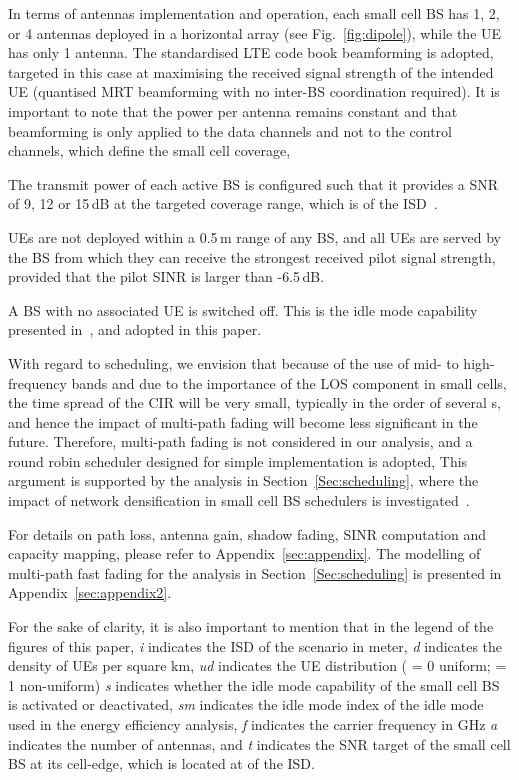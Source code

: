 \documentclass{IEEEtran}
\begin{document}
In terms of antennas implementation and operation,
each small cell \ac{BS} has 1, 2, or 4 antennas deployed in a horizontal array (see Fig.~\ref{fig:dipole}),
while the \ac{UE} has only 1 antenna.
The standardised \ac{LTE} code book beamforming is adopted,
targeted in this case at maximising the received signal strength of the intended \ac{UE}
(quantised \ac{MRT} beamforming with no inter-\ac{BS} coordination required).
It is important to note that the power per antenna remains constant 
and that  beamforming is only applied to the data channels and not to the control channels,
which define the small cell coverage,


The transmit power of each active \ac{BS} is configured such that it provides a \ac{SNR} of 9, 12 or 15\,dB at the targeted coverage range,
which is  of the \ac{ISD}~\cite{Claussen:08a}.


\acp{UE} are not deployed within a 0.5\,m range of any \ac{BS},
and all \acp{UE} are served by the \ac{BS} from which they can receive the strongest received pilot signal strength,
provided that the pilot \ac{SINR} is larger than -6.5\,dB.

A \ac{BS} with no associated \ac{UE} is switched off.
This is the idle mode capability presented in~\cite{Ashraf:10a},
and adopted in this paper.

With regard to scheduling,
we envision that because of the use of mid- to high-frequency bands and due to the importance of the \ac{LOS} component in small cells,
the time spread of the \ac{CIR} will be very small,
typically in the order of several s,
and hence the impact of multi-path fading will become less significant in the future.
Therefore, multi-path fading is not considered in our analysis,
and a round robin scheduler designed for simple implementation is adopted,
This argument is supported by the analysis in Section~\ref{Sec:scheduling},
where the impact of network densification in small cell \ac{BS} schedulers is investigated~\cite{2015Jafari}.


For details on path loss, antenna gain, shadow fading, \ac{SINR} computation and capacity mapping,
please refer to Appendix~\ref{sec:appendix}.
The modelling of multi-path fast fading for the analysis in Section~\ref{Sec:scheduling} is presented in Appendix~\ref{sec:appendix2}.


For the sake of clarity,
it is also important to mention that in the legend of the figures of this paper,
\emph{i} indicates the \ac{ISD} of the scenario in meter,
\emph{d} indicates the density of \acp{UE} per square km,
\emph{ud} indicates the UE distribution ( = 0 uniform;  = 1 non-uniform)
\emph{s} indicates whether the idle mode capability of the small cell \ac{BS} is activated or deactivated,
\emph{sm} indicates the idle mode index of the idle mode used in the energy efficiency analysis,
\emph{f} indicates the carrier frequency in GHz
\emph{a} indicates the number of antennas, and
\emph{t} indicates the \ac{SNR} target of the small cell \ac{BS} at its cell-edge,
which is located at  of the \ac{ISD}.
\end{document}
